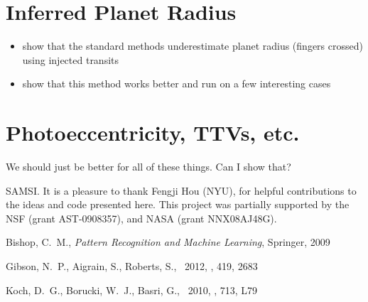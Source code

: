 \documentclass[preprint,12pt]{aastex}
\begin{document}
\section{Inferred Planet Radius}

\begin{itemize}

\item{show that the standard methods underestimate planet radius (fingers
crossed) using injected transits}
\item{show that this method works better and run on a few interesting cases}

\end{itemize}

\section{Photoeccentricity, TTVs, etc.}

We should just be better for all of these things.
Can I show that?


\acknowledgments
SAMSI. %
It is a pleasure to thank
    Fengji Hou (NYU),
for helpful contributions to the ideas and code presented here.
This project was partially supported by the NSF (grant AST-0908357), and NASA
(grant NNX08AJ48G).

\newcommand{\arxiv}[1]{\href{http://arxiv.org/abs/#1}{arXiv:#1}}
\begin{thebibliography}{}\raggedright

Bishop, C.~M., \emph{Pattern Recognition and Machine Learning}, Springer, 2009

Gibson, N.~P., Aigrain, S., Roberts, S., \etal\ 2012, \mnras, 419, 2683

Koch, D.~G., Borucki, W.~J., Basri, G., \etal\ 2010, \apjl, 713, L79

\end{thebibliography}
\end{document}
